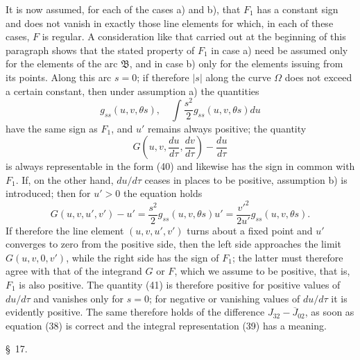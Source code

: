 \documentclass[11pt,a4paper,leqno]{article}
\begin{document}
It is now assumed, for each of the cases a) and b), that $F_1$ has a constant sign and does not vanish in exactly those line elements for which, in each of these cases, $F$ is regular. A consideration like that carried out at the beginning of this paragraph shows that the stated property of $F_1$ in case a) need be assumed only for the elements of the arc $\mathfrak{B}$, and in case b) only for the elements issuing from its points. Along this arc $s=0$; if therefore $|s|$ along the curve $\Omega$ does not exceed a certain constant, then under assumption a) the quantities
\[
g_{ss}(u,v,\theta s),
\quad \int\frac{s^2}{2}g_{ss}(u,v,\theta s)du
\]
have the same sign as $F_1$, and $u'$ remains always positive; the quantity
\begin{equation}\tag{41}
G\left(u,v,\frac{du}{d\tau},\frac{dv}{d\tau}\right)-\frac{du}{d\tau}
\end{equation}
is always representable in the form (40) and likewise has the sign in common with $F_1$. If, on the other hand, $du/d\tau$ ceases in places to be positive, assumption b) is introduced; then for $u'>0$ the equation holds
\[
G(u,v,u',v')-u'=\frac{s^2}{2}g_{ss}(u,v,\theta s)u'
=\frac{v'^2}{2u'}g_{ss}(u,v,\theta s).
\]
If therefore the line element $(u,v,u',v')$ turns about a fixed point and $u'$ converges to zero from the positive side, then the left side approaches the limit $G(u,v,0,v')$, while the right side has the sign of $F_1$; the latter must
therefore agree with that of the integrand $G$ or $F$, which we assume to be positive, that is, $F_1$ is also positive. The quantity (41) is therefore positive for positive values of $du/d\tau$ and vanishes only for $s=0$; for negative or vanishing values of $du/d\tau$ it is evidently positive. The same therefore holds of the difference $J_{32}-\overline{J}_{02}$, as soon as equation (38) is correct and the integral representation (39) has a meaning.

\begin{center}{\large \S~17.}\end{center}
\end{document}
